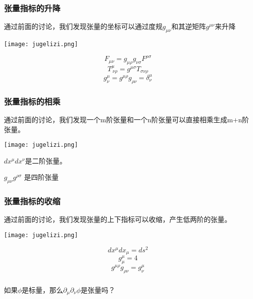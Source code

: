 \documentclass[CJK]{beamer}
\begin{document}
\begin{frame}
\frametitle{\bch 张量指标的升降\ech}
\bch
通过前面的讨论，我们发现张量的坐标可以通过度规$g_{\mu\nu}$和其逆矩阵$g^{\mu\nu}$来升降
\ech
{\vskip 0.1in}

\begin{minipage}{0.3\textwidth}
\texttt{[image: jugelizi.png]}
\end{minipage}
\begin{minipage}{0.6\textwidth}
$$F_{\mu\nu} = g_{\mu\rho}g_{\nu\sigma}F^{\rho\sigma}$$
$$T^{\mu}_{\ \nu\rho} = g^{\mu\sigma} T_{\sigma\nu\rho}$$
$$g^{\mu}_{\nu} = g^{\mu\rho}g_{\rho\nu} = \delta^{\mu}_{\nu}$$
\end{minipage}
\end{frame}


\begin{frame}
\frametitle{\bch 张量指标的相乘\ech}
\bch
通过前面的讨论，我们发现一个m阶张量和一个n阶张量可以直接相乘生成m+n阶张量。
\ech
{\vskip 0.1in}

\begin{minipage}{0.3\textwidth}
\texttt{[image: jugelizi.png]}
\end{minipage}
\begin{minipage}{0.6\textwidth}
\bch
$dx^\mu dx^\nu$是二阶张量。

$g_{\mu\nu}g^{\rho\sigma}$ 是四阶张量
\ech
\end{minipage}
\end{frame}



\begin{frame}
\frametitle{\bch 张量指标的收缩\ech}
\bch
通过前面的讨论，我们发现张量的上下指标可以收缩，产生低两阶的张量。
\ech
{\vskip 0.1in}

\begin{minipage}{0.3\textwidth}
\texttt{[image: jugelizi.png]}
\end{minipage}
\begin{minipage}{0.6\textwidth}
$$dx^\mu dx_\mu = ds^2$$
$$g^{\mu}_{\mu} = 4$$
$$g^{\mu\rho}g_{\rho\nu} = g^{\mu}_{\nu}$$
\end{minipage}
\end{frame}



\begin{frame}
\frametitle{\ech}
\bch
如果$\phi$是标量，那么$\partial_\mu\partial_\nu\phi$是张量吗？
\ech
\end{frame}
\end{document}
